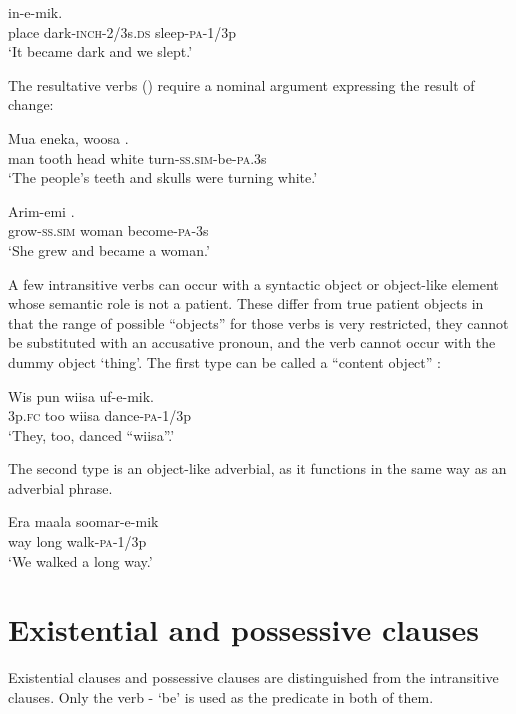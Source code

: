 \ea%
\label{ex:x1021}
\gll {}   in-e-mik. \\
     place  dark-\textsc{inch}-2/3s.\textsc{ds}  sleep-\textsc{pa}-1/3p \\
\glt `It became dark and we slept.'
\z

The resultative verbs () require a nominal argument expressing the result of change: 

\ea%
\label{ex:x963}
\gll Mua  eneka,  woosa   . \\
     man  tooth  head  white  turn-\textsc{ss}.\textsc{sim}-be-\textsc{pa}.3s \\
\glt `The people's teeth and skulls were turning white.'
\z

\ea%
\label{ex:x966}
\gll Arim-emi   . \\
     grow-\textsc{ss}.\textsc{sim}  woman  become-\textsc{pa}-3s \\
\glt `She grew and became a woman.'
\z

A few intransitive verbs can occur with a syntactic object or object-like element whose semantic role is not a patient. These differ from true patient objects in that the range of possible ``objects'' for those verbs is very restricted, they cannot be substituted with an accusative pronoun, and the verb cannot occur with the dummy object  `thing'. The first type can be called a ``content object'' \citep[179]{HakulinenEtAl1979}%
: 

\ea%
\label{ex:x308}
\gll Wis  pun  wiisa  uf-e-mik. \\
     3p.\textsc{fc}  too  wiisa  dance-\textsc{pa}-1/3p \\
\glt `They, too, danced ``wiisa''.'
\z

The second type is an object-like adverbial, as it functions in the same way as an adverbial phrase.

\ea%
\label{ex:x307}
\gll Era  maala  soomar-e-mik \\
     way  long  walk-\textsc{pa}-1/3p \\
\glt `We walked a long way.'
\z

\section{Existential and possessive clauses}
\hypertarget{RefHeading22101935131865}{}
Existential clauses and possessive clauses are distinguished from the intransitive clauses. Only the verb - `be' is used as the predicate in both of them. 

